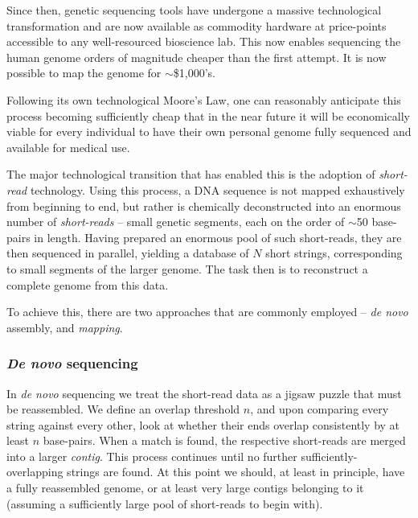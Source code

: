 \documentclass[aps,pra,twocolumn,amsmath,amssymb,nofootinbib,superscriptaddress]{revtex4}
\begin{document}
Since then, genetic sequencing tools have undergone a massive technological transformation and are now available as commodity hardware at price-points accessible to any well-resourced bioscience lab. This now enables sequencing the human genome orders of magnitude cheaper than the first attempt. It is now possible to map the genome for $\sim$\$1,000's.

Following its own technological Moore's Law, one can reasonably anticipate this process becoming sufficiently cheap that in the near future it will be economically viable for every individual to have their own personal genome fully sequenced and available for medical use.

The major technological transition that has enabled this is the adoption of \textit{short-read} technology. Using this process, a DNA sequence is not mapped exhaustively from beginning to end, but rather is chemically deconstructed into an enormous number of \textit{short-reads} -- small genetic segments, each on the order of $\sim$50 base-pairs in length. Having prepared an enormous pool of such short-reads, they are then sequenced in parallel, yielding a database of $N$ short strings, corresponding to small segments of the larger genome. The task then is to reconstruct a complete genome from this data.

To achieve this, there are two approaches that are commonly employed -- \textit{de novo} assembly, and \textit{mapping}.

%
%

\subsubsection{\textit{De novo} sequencing}

In \textit{de novo} sequencing we treat the short-read data as a jigsaw puzzle that must be reassembled. We define an overlap threshold $n$, and upon comparing every string against every other, look at whether their ends overlap consistently by at least $n$ base-pairs. When a match is found, the respective short-reads are merged into a larger \textit{contig}. This process continues until no further sufficiently-overlapping strings are found. At this point we should, at least in principle, have a fully reassembled genome, or at least very large contigs belonging to it (assuming a sufficiently large pool of short-reads to begin with).
\end{document}
